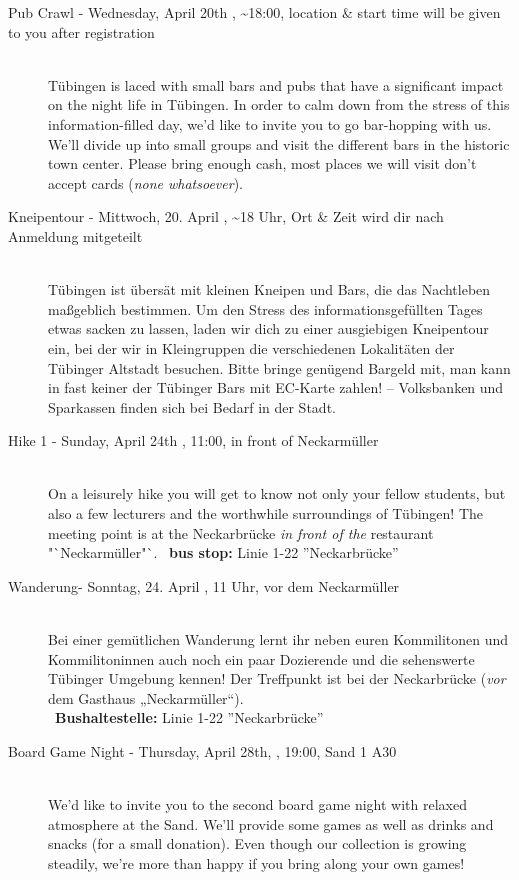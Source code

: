 \begin{description}
\ifml
	\item[Pub Crawl - Wednesday, April 20th \YEAR, \textasciitilde 18:00, \footnotesize{location \& start time will be given to you after registration}]~\\
Tübingen is laced with small bars and pubs that have a significant impact on the night life in Tübingen.
In order to calm down from the stress of this information-filled day, we'd like to invite you to go bar-hopping with us.
We'll divide up into small groups and visit the different bars in the historic town center.
Please bring enough cash, most places we will visit don't accept cards (\emph{none whatsoever}).

\else
	\item[Kneipentour - Mittwoch, 20. April \YEAR, \textasciitilde 18 Uhr, \footnotesize{Ort \& Zeit wird dir nach Anmeldung mitgeteilt}]~\\
Tübingen ist übersät mit kleinen Kneipen und Bars, die das Nachtleben maßgeblich bestimmen.
Um den Stress des informationsgefüllten Tages etwas sacken zu lassen, laden wir dich zu einer ausgiebigen Kneipentour ein,
bei der wir in Kleingruppen die verschiedenen Lokalitäten der Tübinger Altstadt besuchen.
Bitte bringe genügend Bargeld mit, man kann in fast keiner der Tübinger Bars mit EC-Karte zahlen! -- Volksbanken und Sparkassen
finden sich bei Bedarf in der Stadt.
\fi

\ifml
    \item[Hike 1 - Sunday, April 24th \YEAR, 11:00, in front of Neckarmüller]~\\
        On a leisurely hike you will get to know not only your fellow students,
        but also a few lecturers and the worthwhile surroundings of Tübingen!
        The meeting point is at the Neckarbrücke \emph{in front of the} restaurant "`Neckarmüller"`.
        ~\textbf{bus stop:} Linie 1-22 ''Neckarbrücke''
\else
    \item[Wanderung- Sonntag, 24. April \YEAR, 11 Uhr, vor dem Neckarmüller]~\\
        Bei einer gemütlichen Wanderung lernt ihr neben euren Kommilitonen und Kommilitoninnen auch
        noch ein paar Dozierende und die sehenswerte Tübinger Umgebung kennen!
        Der Treffpunkt ist bei der Neckarbrücke (\emph{vor} dem Gasthaus „Neckarmüller“).\\
	    ~\textbf{Bushaltestelle:} Linie 1-22 ''Neckarbrücke''
\fi

\ifml
\item[Board Game Night - Thursday, April 28th, \YEAR, 19:00, Sand 1 A30]\ \\
We'd like to invite you to the second board game night with relaxed atmosphere at the Sand.
We'll provide some games as well as drinks and snacks (for a small donation).
Even though our collection is growing steadily, we're more than happy if you bring along your own games!


\end{description}
